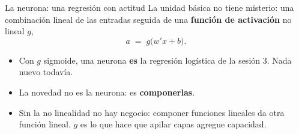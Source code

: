 \documentclass{beamer}
\newcommand{\1}{\mathbb{I}}
\begin{document}
\begin{frame}{La neurona: una regresión con actitud}
\small
La unidad básica no tiene misterio: una combinación lineal de las entradas seguida de una \textbf{función de activación} no lineal $g$,
\[ a \;=\; g\big( w'x + b \big). \]
\begin{center}
\end{center}
\pause
\begin{itemize}\itemsep3pt
  \item Con $g$ sigmoide, una neurona \textbf{es} la regresión logística de la sesión 3. Nada nuevo todavía.
  \item La novedad no es la neurona: es \textbf{componerlas}. \pause
  \item Sin la no linealidad no hay negocio: componer funciones lineales da otra función lineal. $g$ es lo que hace que apilar capas agregue capacidad.
\end{itemize}
\end{frame}
\end{document}
